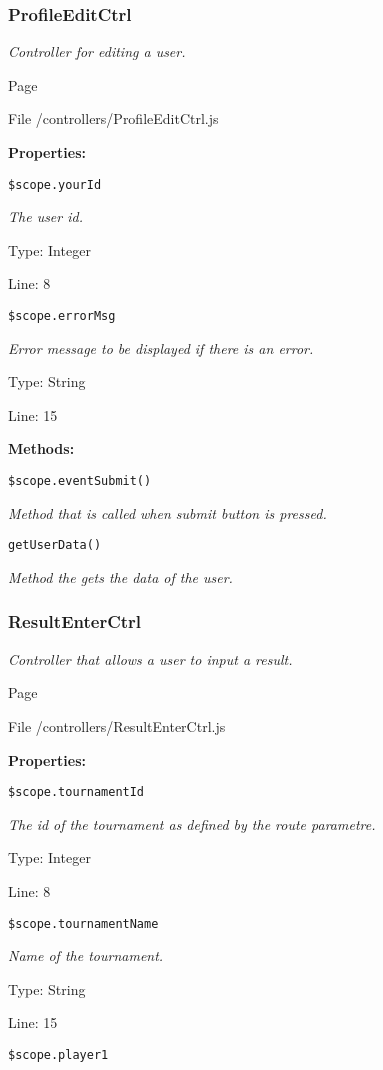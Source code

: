 \subsubsection{ProfileEditCtrl}
\textit{Controller for editing a user.}

Page \pageref{ProfileEditCtrl.js}

File /controllers/ProfileEditCtrl.js

\textbf{Properties:}

\texttt{\$scope.yourId}

{\scriptsize
\textit{The user id.}

Type: Integer

Line: 8

}
\texttt{\$scope.errorMsg}

{\scriptsize
\textit{Error message to be displayed if there is an error.}

Type: String

Line: 15

}
\textbf{Methods:}

\texttt{\$scope.eventSubmit()}

{\scriptsize
\textit{Method that is called when submit button is pressed.}

}

\texttt{getUserData()}

{\scriptsize
\textit{Method the gets the data of the user.}

}

\subsubsection{ResultEnterCtrl}
\textit{Controller that allows a user to input a result.}

Page \pageref{ResultEnterCtrl.js}

File /controllers/ResultEnterCtrl.js

\textbf{Properties:}

\texttt{\$scope.tournamentId}

{\scriptsize
\textit{The id of the tournament as defined by the route parametre.}

Type: Integer

Line: 8

}
\texttt{\$scope.tournamentName}

{\scriptsize
\textit{Name of the tournament.}

Type: String

Line: 15

}
\texttt{\$scope.player1}


